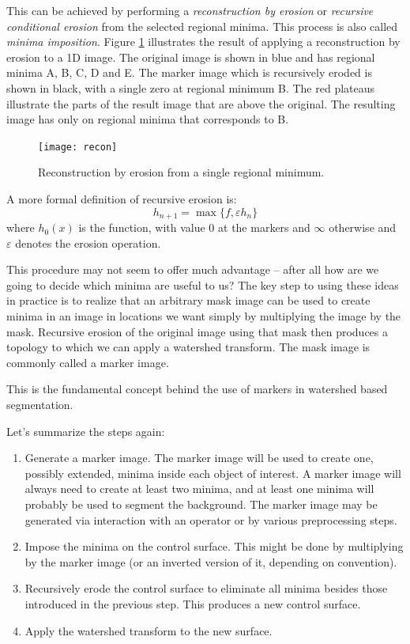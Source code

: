 \documentclass{InsightArticle}
\begin{document}
This can be achieved by performing a {\em reconstruction by erosion}
or {\em recursive conditional erosion} from the selected regional
minima. This process is also called {\em minima imposition}. Figure
\ref{fig:recon} illustrates the result of applying a
reconstruction by erosion to a 1D image. The original image is shown
in blue and has regional minima A, B, C, D and E. The marker image
which is recursively eroded is shown in black, with a single zero at
regional minimum B. The red plateaus illustrate the parts of the
result image that are above the original. The resulting image has only
on regional minima that corresponds to B.
\begin{figure}[htbp]
\begin{center}
\texttt{[image: recon]}
\caption{Reconstruction by erosion from a single regional minimum.}
\label{fig:recon}
\end{center}
\end{figure}

A more formal definition of recursive erosion is:
\begin{equation}
\label{eq:recon_erosion}
h_{n+1}=\max\{f, \varepsilon h_n\}
\end{equation}
where $h_0(x)$ is the function, with value 0 at the markers and
$\infty$ otherwise and $\varepsilon$ denotes the erosion
operation.

This procedure may not seem to offer much advantage -- after all how
are we going to decide which minima are useful to us? The key step to
using these ideas in practice is to realize that an arbitrary mask
image can be used to create minima in an image in locations we want
simply by multiplying the image by the mask. Recursive erosion of the
original image using that mask then produces a topology to which we
can apply a watershed transform. The mask image is commonly called a
marker image.

This is the fundamental concept behind the use of markers in watershed
based segmentation.

Let's summarize the steps again:

\begin{enumerate}
\item Generate a marker image. The marker image will be used to create 
one, possibly extended, minima inside each object of interest. A
marker image will always need to create at least two minima, and at
least one minima will probably be used to segment the background. The
marker image may be generated via interaction with an operator or by
various preprocessing steps.
\item \label{recipe:min}Impose the minima on the control surface. This 
might be done by multiplying by the marker image (or an inverted
version of it, depending on convention).
\item \label{recipe:erode}Recursively erode the control surface to eliminate all minima besides those introduced in the previous step. This produces a new control surface.
\item Apply the watershed transform to the new surface.
\end{enumerate}
\end{document}
